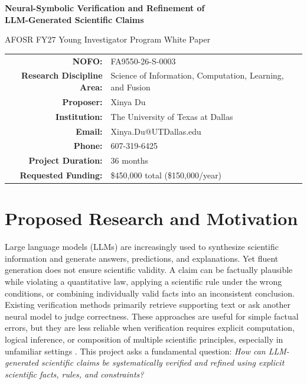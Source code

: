 \documentclass[12pt]{article}
\begin{document}
\begin{titlepage}
\thispagestyle{empty}
\begin{center}
\vspace*{1.0in}

{\Large\bfseries Neural-Symbolic Verification and Refinement of\\
LLM-Generated Scientific Claims\par}

\vspace{0.6in}

{\large AFOSR FY27 Young Investigator Program White Paper\par}

\vspace{0.35in}

\begin{tabular}{rl}
\textbf{NOFO:} & FA9550-26-S-0003 \\
\textbf{Research Discipline Area:} & Science of Information, Computation, Learning, and Fusion \\
\textbf{Proposer:} & Xinya Du \\
\textbf{Institution:} & The University of Texas at Dallas \\
\textbf{Email:} & Xinya.Du@UTDallas.edu \\
\textbf{Phone:} & 607-319-6425 \\
\textbf{Project Duration:} & 36 months \\
\textbf{Requested Funding:} & \$450,000 total (\$150,000/year) \\
\end{tabular}

\vfill
\end{center}
\end{titlepage}

\setcounter{page}{1}

\section*{Proposed Research and Motivation}

Large language models (LLMs) are increasingly used to synthesize scientific information and generate answers, predictions, and explanations. Yet fluent generation does not ensure scientific validity. A claim can be factually plausible while violating a quantitative law, applying a scientific rule under the wrong conditions, or combining individually valid facts into an inconsistent conclusion. Existing verification methods primarily retrieve supporting text or ask another neural model to judge correctness. These approaches are useful for simple factual errors, but they are less reliable when verification requires explicit computation, logical inference, or composition of multiple scientific principles, especially in unfamiliar settings \citep{ji2023survey,wadden2020scifact}. This project asks a fundamental question: \emph{How can LLM-generated scientific claims be systematically verified and refined using explicit scientific facts, rules, and constraints?}
\end{document}
